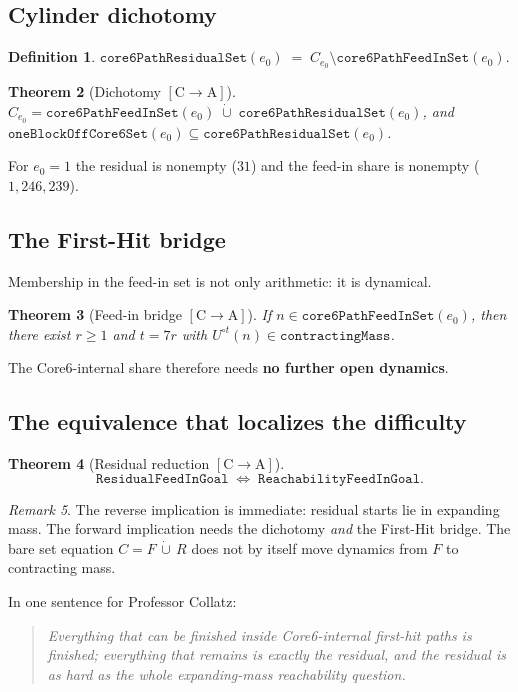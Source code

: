 \documentclass[11pt,a4paper]{article}
\newtheorem{theorem}{Theorem}
\theoremstyle{definition}
\newtheorem{definition}[theorem]{Definition}
\theoremstyle{remark}
\newtheorem{remark}[theorem]{Remark}
\newcommand{\CA}{\ensuremath{[\mathrm{C}\!\to\!\mathrm{A}]}}
\newcommand{\FeedIn}{\mathtt{core6PathFeedInSet}}
\newcommand{\Residual}{\mathtt{core6PathResidualSet}}
\newcommand{\Umap}{U}
\begin{document}
\subsection{Cylinder dichotomy}
\begin{definition}
$\Residual(e_0) \;=\; C_{e_0}\setminus\FeedIn(e_0)$.
\end{definition}
\begin{theorem}[Dichotomy \CA]
$C_{e_0}=\FeedIn(e_0)\;\dot\cup\;\Residual(e_0)$,
and $\mathtt{oneBlockOffCore6Set}(e_0)\subseteq\Residual(e_0)$.
\end{theorem}
For $e_0=1$ the residual is nonempty ($31$) and the feed-in share is nonempty
($1{,}246{,}239$).

\subsection{The First-Hit bridge}
Membership in the feed-in set is not only arithmetic: it is dynamical.
\begin{theorem}[Feed-in bridge \CA]
If $n\in\FeedIn(e_0)$, then there exist $r\ge 1$ and
$t=7r$ with $\Umap^{\circ t}(n)\in\mathtt{contractingMass}$.
\end{theorem}
The Core6-internal share therefore needs \textbf{no further open dynamics}.

\subsection{The equivalence that localizes the difficulty}
\begin{theorem}[Residual reduction \CA]
\[
  \mathtt{ResidualFeedInGoal}
  \;\Longleftrightarrow\;
  \mathtt{ReachabilityFeedInGoal}.
\]
\end{theorem}
\begin{remark}
The reverse implication is immediate: residual starts lie in expanding mass.
The forward implication needs the dichotomy \emph{and} the First-Hit bridge.
The bare set equation $C=F\,\dot\cup\,R$ does not by itself move dynamics from
$F$ to contracting mass.
\end{remark}

In one sentence for Professor Collatz:
\begin{quote}
\emph{Everything that can be finished inside Core6-internal first-hit paths
is finished; everything that remains is exactly the residual, and the residual
is as hard as the whole expanding-mass reachability question.}
\end{quote}
\end{document}
